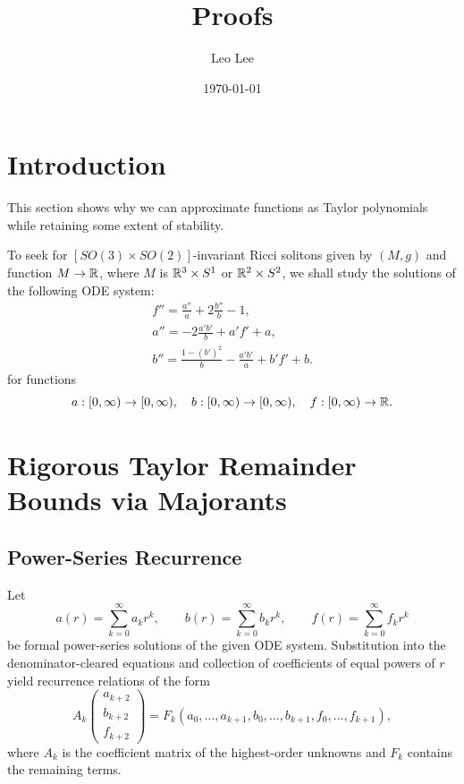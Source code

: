\documentclass[11pt,letterpaper]{article}
\begin{document}
\title{Proofs}
\author{Leo Lee}
\date{\today}

\maketitle

\section{Introduction}

This section shows why we can approximate functions as Taylor polynomials while retaining some extent of stability.

To seek for $[SO(3) \times SO(2)]$-invariant Ricci solitons given by $(M, g)$ and function $M \to \mathbb{R}$, where $M$ is $\mathbb{R}^3 \times S^1$ or $\mathbb{R}^2 \times S^2$, we shall study the solutions of the following ODE system:
\begin{gather}
    f'' = \frac{a''}{a} + 2 \frac{b''}{b} - 1, \\
    a'' = -2\frac{a'b'}{b} + a'f' + a, \\
    b'' = \frac{1 - (b')^2}{b} - \frac{a'b'}{a} + b'f' + b.
\end{gather}
for functions
\[ a: [0, \infty) \to [0, \infty), \quad b: [0, \infty) \to [0, \infty), \quad f: [0, \infty) \to \mathbb{R}. \]

\section{Rigorous Taylor Remainder Bounds via Majorants}

\subsection{Power-Series Recurrence}

Let
\[
a(r)=\sum_{k=0}^{\infty}a_k r^k,\qquad
b(r)=\sum_{k=0}^{\infty}b_k r^k,\qquad
f(r)=\sum_{k=0}^{\infty}f_k r^k
\]
be formal power-series solutions of the given ODE system.
Substitution into the denominator-cleared equations and
collection of coefficients of equal powers of \(r\) yield
recurrence relations of the form
\[
A_k
\begin{pmatrix}
a_{k+2}\\
b_{k+2}\\
f_{k+2}
\end{pmatrix}
=
F_k(a_0,\ldots,a_{k+1},
    b_0,\ldots,b_{k+1},
    f_0,\ldots,f_{k+1}),
\]
where \(A_k\) is the coefficient matrix of the highest-order
unknowns and \(F_k\) contains the remaining terms.
\end{document}
